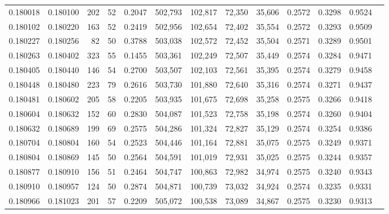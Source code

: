 \begin{tabular}{rrrrrrrrrrrrr}
0.180018 & 0.180100 &   202 &  52 &                                     0.2047 & 502,793 & 102,817 &  72,350 &  35,606 & 0.2572 & 0.3298 & 0.9524 \\
0.180102 & 0.180220 &   163 &  52 &                                     0.2419 & 502,956 & 102,654 &  72,402 &  35,554 & 0.2572 & 0.3293 & 0.9509 \\
0.180227 & 0.180256 &    82 &  50 &                                     0.3788 & 503,038 & 102,572 &  72,452 &  35,504 & 0.2571 & 0.3289 & 0.9501 \\
0.180263 & 0.180402 &   323 &  55 &                                     0.1455 & 503,361 & 102,249 &  72,507 &  35,449 & 0.2574 & 0.3284 & 0.9471 \\
0.180405 & 0.180440 &   146 &  54 &                                     0.2700 & 503,507 & 102,103 &  72,561 &  35,395 & 0.2574 & 0.3279 & 0.9458 \\
0.180448 & 0.180480 &   223 &  79 &                                     0.2616 & 503,730 & 101,880 &  72,640 &  35,316 & 0.2574 & 0.3271 & 0.9437 \\
0.180481 & 0.180602 &   205 &  58 &                                     0.2205 & 503,935 & 101,675 &  72,698 &  35,258 & 0.2575 & 0.3266 & 0.9418 \\
0.180604 & 0.180632 &   152 &  60 &                                     0.2830 & 504,087 & 101,523 &  72,758 &  35,198 & 0.2574 & 0.3260 & 0.9404 \\
0.180632 & 0.180689 &   199 &  69 &                                     0.2575 & 504,286 & 101,324 &  72,827 &  35,129 & 0.2574 & 0.3254 & 0.9386 \\
0.180704 & 0.180804 &   160 &  54 &                                     0.2523 & 504,446 & 101,164 &  72,881 &  35,075 & 0.2575 & 0.3249 & 0.9371 \\
0.180804 & 0.180869 &   145 &  50 &                                     0.2564 & 504,591 & 101,019 &  72,931 &  35,025 & 0.2575 & 0.3244 & 0.9357 \\
0.180877 & 0.180910 &   156 &  51 &                                     0.2464 & 504,747 & 100,863 &  72,982 &  34,974 & 0.2575 & 0.3240 & 0.9343 \\
0.180910 & 0.180957 &   124 &  50 &                                     0.2874 & 504,871 & 100,739 &  73,032 &  34,924 & 0.2574 & 0.3235 & 0.9331 \\
0.180966 & 0.181023 &   201 &  57 &                                     0.2209 & 505,072 & 100,538 &  73,089 &  34,867 & 0.2575 & 0.3230 & 0.9313 \\

\end{tabular}
